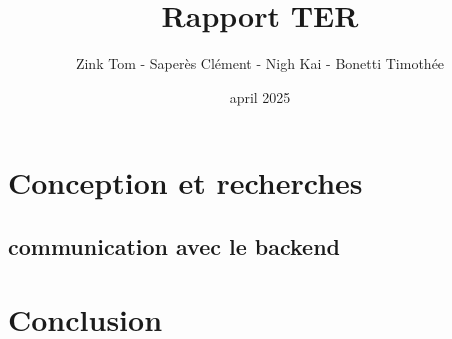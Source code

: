 \documentclass[french,a4paper,10pt]{article}
\title{\color{astral} \sffamily \bfseries Rapport TER}
\author{Zink Tom - Saperès Clément - Nigh Kai - Bonetti Timothée}
\date{april 2025}
\begin{document}
\maketitle

\hypersetup{
    hidelinks           %
}

\tableofcontents


\newpage


    

\newpage


\section{Conception et recherches}
    
    
    
    

    
    
    
    
    

    

    
    
    
    
        
        
    \subsection{communication avec le backend}

\section{Conclusion}
\end{document}
